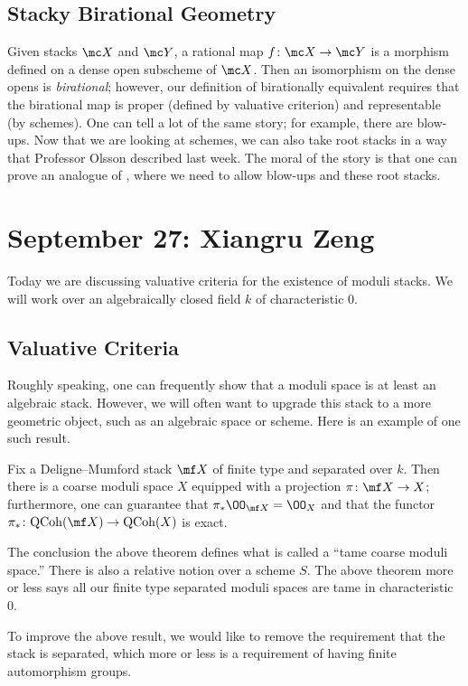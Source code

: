 \documentclass{article}
\begin{document}
\subsection{Stacky Birational Geometry}
Given stacks $\mc X$ and $\mc Y$, a rational map $f\colon\mc X\to\mc Y$ is a morphism defined on a dense open subscheme of $\mc X$. Then an isomorphism on the dense opens is \textit{birational}; however, our definition of birationally equivalent requires that the birational map is proper (defined by valuative criterion) and representable (by schemes). One can tell a lot of the same story; for example, there are blow-ups. Now that we are looking at schemes, we can also take root stacks in a way that Professor Olsson described last week. The moral of the story is that one can prove an analogue of , where we need to allow blow-ups and these root stacks.

\section{September 27: Xiangru Zeng}
Today we are discussing valuative criteria for the existence of moduli stacks. We will work over an algebraically closed field $k$ of characteristic $0$.

\subsection{Valuative Criteria}
Roughly speaking, one can frequently show that a moduli space is at least an algebraic stack. However, we will often want to upgrade this stack to a more geometric object, such as an algebraic space or scheme. Here is an example of one such result.
\begin{theorem}
    Fix a Deligne--Mumford stack $\mf X$ of finite type and separated over $k$. Then there is a coarse moduli space $X$ equipped with a projection $\pi\colon\mf X\to X$; furthermore, one can guarantee that $\pi_*\OO_{\mf X}=\OO_X$ and that the functor $\pi_*\colon\mathrm{QCoh}(\mf X)\to\mathrm{QCoh}(X)$ is exact.
\end{theorem}
\begin{remark}
    The conclusion the above theorem defines what is called a ``tame coarse moduli space.'' There is also a relative notion over a scheme $S$. The above theorem more or less says all our finite type separated moduli spaces are tame in characteristic $0$.
\end{remark}
To improve the above result, we would like to remove the requirement that the stack is separated, which more or less is a requirement of having finite automorphism groups.
\end{document}
